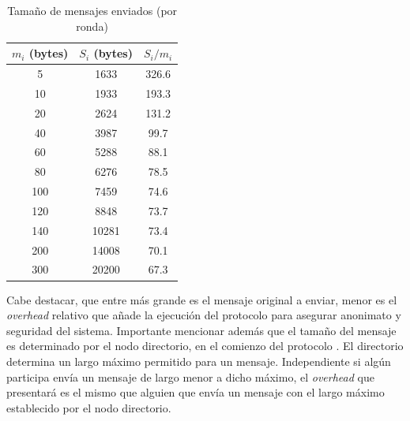\begin{table}[h!]
\centering
\begin{tabular}[h!]{|c|c|c|}
\hline
$m_i$ (bytes) & $S_i$ (bytes) & $S_i / m_i$ \\ \hline
5                                   & 1633                               & 326.6       \\ \hline
10                                  & 1933                               & 193.3       \\ \hline
20                                  & 2624                               & 131.2       \\ \hline
40                                  & 3987                               & 99.7        \\ \hline
60                                  & 5288                               & 88.1        \\ \hline
80                                  & 6276                               & 78.5        \\ \hline
100                                 & 7459                               & 74.6        \\ \hline
120                                 & 8848                               & 73.7        \\ \hline
140                                 & 10281                              & 73.4        \\ \hline
200                                 & 14008                              & 70.1        \\ \hline
300                                 & 20200                              & 67.3        \\ \hline
\end{tabular}
\caption{Tamaño de mensajes enviados (por ronda)}
\label{table:message_sizes_table}
\end{table}

Cabe destacar, que entre más grande es el mensaje original a enviar, menor es 
el \emph{overhead} relativo que añade la ejecución del protocolo para asegurar 
anonimato y seguridad del sistema. Importante mencionar además que el tamaño 
del mensaje es determinado por el nodo directorio, en el comienzo del protocolo
. El directorio determina un largo máximo permitido para un mensaje. 
Independiente si algún participa envía un mensaje de largo menor a dicho 
máximo, el \emph{overhead} que presentará es el mismo que alguien que envía un 
mensaje con el largo máximo establecido por el nodo directorio.
